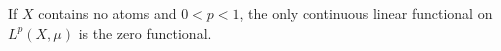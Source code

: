 If $X$ contains no atoms and $0 < p < 1$, the only continuous linear functional on $L^p(X, \mu)$ is the zero functional.
